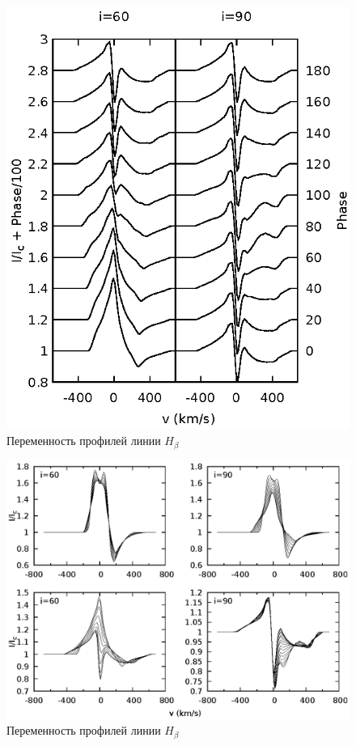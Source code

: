 \documentclass{article}
\begin{document}
\begin{figure} [!htb]
 	\centering
    \includegraphics[width=1.0\textwidth]{rot_all_60_90}
    \caption{Переменность профилей линии $H_\beta$}
\end{figure}

\begin{figure} [!htb]
    \centering
    \includegraphics[width=1.0\textwidth]{rot_10_30_60_90}
    \caption{Переменность профилей линии $H_\beta$}
\end{figure}
\end{document}
